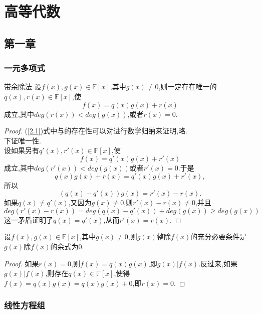 \documentclass[lang=cn,11pt,normal]{elegantbook}
\begin{document}
	\chapter{高等代数}
	\section{第一章}
	\subsection{一元多项式}
	\begin{definition}{带余除法}{}
		设$f(x),g(x)\in \mathbb{F}[x]$,其中$g(x)\ne0$,则一定存在唯一的$q(x),r(x)\in\mathbb{F}[x]$,使
		\begin{equation}
		f(x)=q(x)g(x)+r(x)\label{2.1}
		\end{equation}
		成立,其中$deg(r(x))<deg(g(x))$,或者$r(x)=0$.
	\end{definition}
	\begin{proof}
		(\ref{2.1})式中与的存在性可以对进行数学归纳来证明,略.\\
		下证唯一性.\\
		设如果另有$q'(x),r'(x)\in\mathbb{F}[x]$,使
		\begin{equation}
		f(x)=q'(x)g(x)+r'(x)
		\end{equation}
		成立,其中$deg(r'(x))<deg(g(x))$或者$r'(x)=0$.于是
		\begin{equation}
			q(x)g(x)+r(x)=q'(x)g(x)+r'(x),
		\end{equation}
		所以
		\begin{equation}
			(q(x)-q'(x))g(x)=r'(x)-r(x).
		\end{equation}
		如果$q(x)\ne q'(x)$,又因为$g(x)\ne0$,则$r'(x)-r(x)\ne 0$,并且
		\begin{equation}
			deg(r'(x)-r(x))=deg(q(x)-q'(x))+deg(g(x))\geqslant deg(g(x))
		\end{equation}
		这一矛盾证明了$q(x)=q'(x)$,从而$r'(x)=r(x)$.
	\end{proof}
	\begin{theorem}{ }{ }
		 设$f(x),g(x)\in \mathbb{F}[x]$,其中$g(x)\ne 0$,则$g(x)$整除$f(x)$的充分必要条件是$g(x)$除$f(x)$的余式为0.
	\end{theorem}
	\begin{proof}
		如果$r(x)=0$,则$f(x)=q(x)g(x)$,即$g(x)|f(x)$.反过来,如果$g(x)|f(x)$,则存在$q(x)\in\mathbb{F}[x]$,使得$f(x)=q(x)g(x)=q(x)g(x)+0$,即$r(x)=0$.
	\end{proof}
	\subsection{线性方程组}
\end{document}
